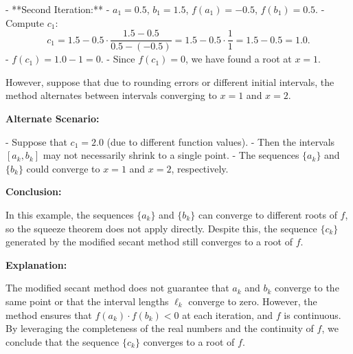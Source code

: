 \documentclass{article}
\begin{document}
- **Second Iteration:**
  - \( a_1 = 0.5 \), \( b_1 = 1.5 \), \( f(a_1) = -0.5 \), \( f(b_1) = 0.5 \).
  - Compute \( c_1 \):
    \[
    c_1 = 1.5 - 0.5 \cdot \frac{1.5 - 0.5}{0.5 - (-0.5)} = 1.5 - 0.5 \cdot \frac{1}{1} = 1.5 - 0.5 = 1.0.
    \]
  - \( f(c_1) = 1.0 - 1 = 0 \).
  - Since \( f(c_1) = 0 \), we have found a root at \( x = 1 \).

However, suppose that due to rounding errors or different initial intervals, the method alternates between intervals converging to \( x = 1 \) and \( x = 2 \).

\textbf{Alternate Scenario:}

- Suppose that \( c_1 = 2.0 \) (due to different function values).
- Then the intervals \( [a_k, b_k] \) may not necessarily shrink to a single point.
- The sequences \( \{ a_k \} \) and \( \{ b_k \} \) could converge to \( x = 1 \) and \( x = 2 \), respectively.

\bigskip

\textbf{Conclusion:}

In this example, the sequences \( \{ a_k \} \) and \( \{ b_k \} \) can converge to different roots of \( f \), so the squeeze theorem does not apply directly. Despite this, the sequence \( \{ c_k \} \) generated by the modified secant method still converges to a root of \( f \).

\bigskip

\textbf{Explanation:}

The modified secant method does not guarantee that \( a_k \) and \( b_k \) converge to the same point or that the interval lengths \( \ell_k \) converge to zero. However, the method ensures that \( f(a_k) \cdot f(b_k) < 0 \) at each iteration, and \( f \) is continuous. By leveraging the completeness of the real numbers and the continuity of \( f \), we conclude that the sequence \( \{ c_k \} \) converges to a root of \( f \).
\end{document}
